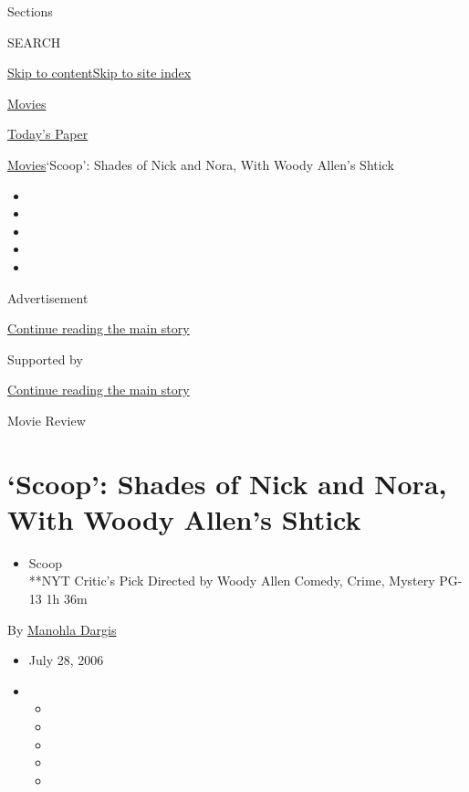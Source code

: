 Sections

SEARCH

\protect\hyperlink{site-content}{Skip to
content}\protect\hyperlink{site-index}{Skip to site index}

\href{https://www.nytimes3xbfgragh.onion/section/movies}{Movies}

\href{https://myaccount.nytimes3xbfgragh.onion/auth/login?response_type=cookie\&client_id=vi}{}

\href{https://www.nytimes3xbfgragh.onion/section/todayspaper}{Today's
Paper}

\href{/section/movies}{Movies}\textbar{}`Scoop': Shades of Nick and
Nora, With Woody Allen's Shtick

\begin{itemize}
\item
\item
\item
\item
\item
\end{itemize}

Advertisement

\protect\hyperlink{after-top}{Continue reading the main story}

Supported by

\protect\hyperlink{after-sponsor}{Continue reading the main story}

Movie Review

\hypertarget{scoop-shades-of-nick-and-nora-with-woody-allens-shtick}{%
\section{`Scoop': Shades of Nick and Nora, With Woody Allen's
Shtick}\label{scoop-shades-of-nick-and-nora-with-woody-allens-shtick}}

\begin{itemize}
\tightlist
\item
  Scoop\\
  **NYT Critic's Pick Directed by Woody Allen Comedy, Crime, Mystery
  PG-13 1h 36m
\end{itemize}

By \href{https://www.nytimes3xbfgragh.onion/by/manohla-dargis}{Manohla
Dargis}

\begin{itemize}
\item
  July 28, 2006
\item
  \begin{itemize}
  \item
  \item
  \item
  \item
  \item
  \end{itemize}
\end{itemize}

